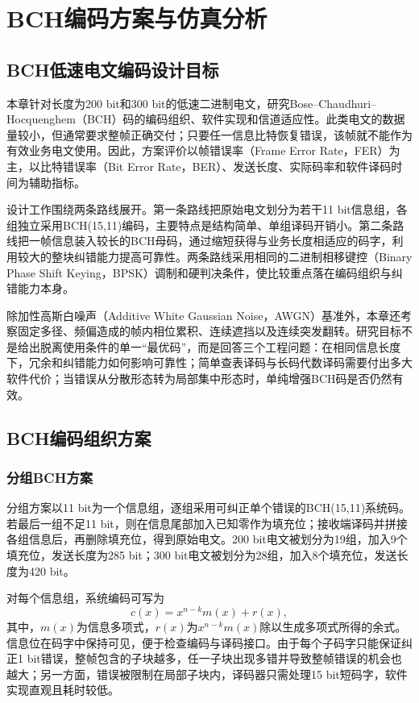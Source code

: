 \chapter{BCH编码方案与仿真分析}\label{chap:bch}

\section{BCH低速电文编码设计目标}

本章针对长度为200 bit和300 bit的低速二进制电文，研究Bose--Chaudhuri--Hocquenghem（BCH）码的编码组织、软件实现和信道适应性。此类电文的数据量较小，但通常要求整帧正确交付；只要任一信息比特恢复错误，该帧就不能作为有效业务电文使用。因此，方案评价以帧错误率（Frame Error Rate，FER）为主，以比特错误率（Bit Error Rate，BER）、发送长度、实际码率和软件译码时间为辅助指标。

设计工作围绕两条路线展开。第一条路线把原始电文划分为若干11 bit信息组，各组独立采用BCH(15,11)编码，主要特点是结构简单、单组译码开销小。第二条路线把一帧信息装入较长的BCH母码，通过缩短获得与业务长度相适应的码字，利用较大的整块纠错能力提高可靠性。两条路线采用相同的二进制相移键控（Binary Phase Shift Keying，BPSK）调制和硬判决条件，使比较重点落在编码组织与纠错能力本身。

除加性高斯白噪声（Additive White Gaussian Noise，AWGN）基准外，本章还考察固定多径、频偏造成的帧内相位累积、连续遮挡以及连续突发翻转。研究目标不是给出脱离使用条件的单一“最优码”，而是回答三个工程问题：在相同信息长度下，冗余和纠错能力如何影响可靠性；简单查表译码与长码代数译码需要付出多大软件代价；当错误从分散形态转为局部集中形态时，单纯增强BCH码是否仍然有效。

\section{BCH编码组织方案}

\subsection{分组BCH方案}

分组方案以11 bit为一个信息组，逐组采用可纠正单个错误的BCH(15,11)系统码。若最后一组不足11 bit，则在信息尾部加入已知零作为填充位；接收端译码并拼接各组信息后，再删除填充位，得到原始电文。200 bit电文被划分为19组，加入9个填充位，发送长度为285 bit；300 bit电文被划分为28组，加入8个填充位，发送长度为420 bit。

对每个信息组，系统编码可写为
\begin{equation}
  c(x)=x^{n-k}m(x)+r(x),
\end{equation}
其中，$m(x)$为信息多项式，$r(x)$为$x^{n-k}m(x)$除以生成多项式所得的余式。信息位在码字中保持可见，便于检查编码与译码接口。由于每个子码字只能保证纠正1 bit错误，整帧包含的子块越多，任一子块出现多错并导致整帧错误的机会也越大；另一方面，错误被限制在局部子块内，译码器只需处理15 bit短码字，软件实现直观且耗时较低。

